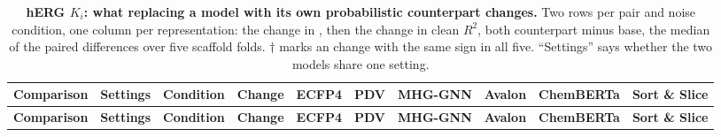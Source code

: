 
{\scriptsize
\begin{longtable}{llllcccccc}
\caption{\textbf{\SuppFile{} hERG $K_i$: what replacing a model with its own probabilistic counterpart changes.}
Two rows per pair and noise condition, one column per representation: the change in \aucnorm{}, then the change in clean $R^2$, both counterpart minus base, the median of the paired differences over five scaffold folds. $\dagger$ marks an \aucnorm{} change with the same sign in all five. ``Settings'' says whether the two models share one setting.}
\label{supp:counterparts_herg}\\
\toprule
\textbf{Comparison} & \textbf{Settings} & \textbf{Condition} & \textbf{Change} & \textbf{ECFP4} & \textbf{PDV} & \textbf{MHG-GNN} & \textbf{Avalon} & \textbf{ChemBERTa} & \textbf{Sort \& Slice} \\
\midrule
\endfirsthead
\toprule
\textbf{Comparison} & \textbf{Settings} & \textbf{Condition} & \textbf{Change} & \textbf{ECFP4} & \textbf{PDV} & \textbf{MHG-GNN} & \textbf{Avalon} & \textbf{ChemBERTa} & \textbf{Sort \& Slice} \\
\midrule
\endhead

\bottomrule
\end{longtable}}
